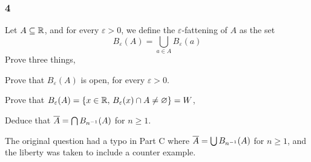 \documentclass[../main.tex]{subfiles}
\begin{document}
\subsubsection*{4}
\begin{wts}
    Let $A\subseteq\mathbb{R}$, and for every $\varepsilon>0$, we define the $\varepsilon$-fattening of $A$ as the set\[B_\varepsilon(A)=\bigcup_{a\in A}B_{\varepsilon}(a)\]
    Prove three things,
    \begin{enumalpha}
        \item Prove that $B_\varepsilon(A)$ is open, for every $\varepsilon>0$.
        \item Prove that $B_\varepsilon(A)=\{x\in\mathbb{R},\, B_\varepsilon(x)\cap A\neq \varnothing\}=W$,
        \item Deduce that $\overline{A}=\bigcap B_{n^{-1}}(A)$ for $n\geq 1$.
    \end{enumalpha}
    The original question had a typo in Part C where $\overline{A}=\bigcup B_{n^{-1}}(A)$ for $n\geq 1$, and the liberty was taken to include a counter example.
\end{wts}
\end{document}
